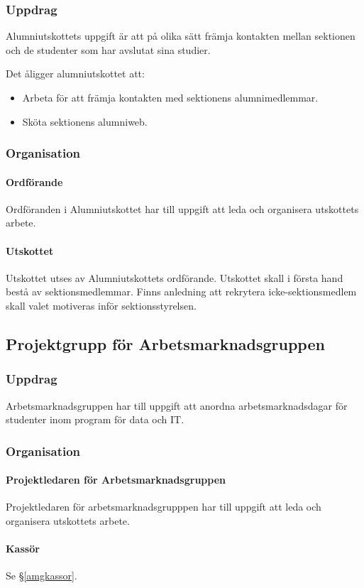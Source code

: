 \documentclass{datateknologsektionen-document}
\begin{document}
\subsubsection{Uppdrag}
Alumniutskottets uppgift är att på olika sätt främja kontakten mellan
sektionen och de studenter som har avslutat sina studier.

Det åligger alumniutskottet att:
\begin{itemize}
  \item Arbeta för att främja kontakten med sektionens alumnimedlemmar.
  \item Sköta sektionens alumniweb.
\end{itemize}
\subsubsection{Organisation}
\paragraph{Ordförande}
Ordföranden i Alumniutskottet har till uppgift att leda och organisera utskottets arbete.
\paragraph{Utskottet}
Utskottet utses av Alumniutskottets ordförande. Utskottet skall i första hand bestå av
sektionsmedlemmar. Finns anledning att rekrytera icke-sektionsmedlem skall valet
motiveras inför sektionsstyrelsen.

\subsection{Projektgrupp för Arbetsmarknadsgruppen}
\label{amg}
\subsubsection{Uppdrag}
Arbetsmarknadsgruppen har till uppgift att anordna arbetsmarknadsdagar för studenter inom
program för data och IT.
\subsubsection{Organisation}
\paragraph{Projektledaren för Arbetsmarknadsgruppen}
Projektledaren för arbetsmarknadsgrupppen har till uppgift att leda och organisera
utskottets arbete.
\paragraph{Kassör}
Se \S \ref{amgkassor}.
\end{document}
